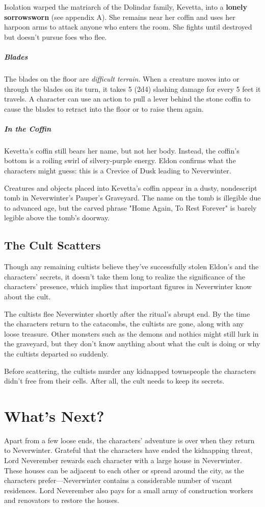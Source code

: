 \documentclass[10pt,a4paper,twoside,bg=print,twocolumn,openany,nodeprecatedcode]{dndbook}
\begin{document}
Isolation warped the matriarch of the Dolindar family, Kevetta, into a \textbf{lonely sorrowsworn} (see appendix A). She remains near her coffin and uses her harpoon arms to attack anyone who enters the room. She fights until destroyed but doesn't pursue foes who flee.

\subparagraph{Blades}
The blades on the floor are \textit{difficult terrain}. When a creature moves into or through the blades on its turn, it takes 5 (2d4) slashing damage for every 5 feet it travels. A character can use an action to pull a lever behind the stone coffin to cause the blades to retract into the floor or to raise them again.

\subparagraph{In the Coffin}
Kevetta's coffin still bears her name, but not her body. Instead, the coffin's bottom is a roiling swirl of silvery-purple energy. Eldon confirms what the characters might guess: this is a Crevice of Dusk leading to Neverwinter.

Creatures and objects placed into Kevetta's coffin appear in a dusty, nondescript tomb in Neverwinter's Pauper's Graveyard. The name on the tomb is illegible due to advanced age, but the carved phrase "Home Again, To Rest Forever" is barely legible above the tomb's doorway.

\subsection{The Cult Scatters}
Though any remaining cultists believe they've successfully stolen Eldon's and the characters' secrets, it doesn't take them long to realize the significance of the characters' presence, which implies that important figures in Neverwinter know about the cult.

The cultists flee Neverwinter shortly after the ritual's abrupt end. By the time the characters return to the catacombs, the cultists are gone, along with any loose treasure. Other monsters such as the demons and nothics might still lurk in the graveyard, but they don't know anything about what the cult is doing or why the cultists departed so suddenly.

Before scattering, the cultists murder any kidnapped townspeople the characters didn't free from their cells. After all, the cult needs to keep its secrets.

\section{What's Next?}
Apart from a few loose ends, the characters' adventure is over when they return to Neverwinter. Grateful that the characters have ended the kidnapping threat, Lord Neverember rewards each character with a large house in Neverwinter. These houses can be adjacent to each other or spread around the city, as the characters prefer—Neverwinter contains a considerable number of vacant residences. Lord Neverember also pays for a small army of construction workers and renovators to restore the houses.
\end{document}
